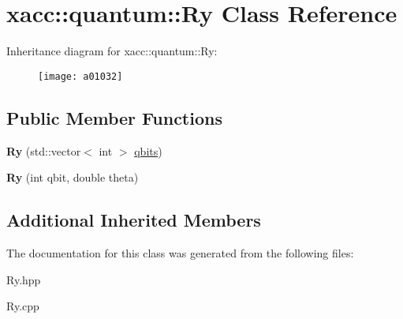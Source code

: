 \hypertarget{a01032}{}\section{xacc\+:\+:quantum\+:\+:Ry Class Reference}
\label{a01032}
Inheritance diagram for xacc\+:\+:quantum\+:\+:Ry\+:\begin{figure}[H]
\begin{center}
\leavevmode
\texttt{[image: a01032]}
\end{center}
\end{figure}
\subsection*{Public Member Functions}
\begin{DoxyCompactItemize}
\item 
\mbox{\label{a01032_a542e1c0576a8e784f6cece4c77598486}} 
{\bfseries Ry} (std\+::vector$<$ int $>$ \hyperlink{a00992_a2a56be6c2519ea65df4d06f4abae1393}{qbits})
\item 
\mbox{\label{a01032_a1cb81fe622168ba8d79fa2a78b5b0006}} 
{\bfseries Ry} (int qbit, double theta)
\end{DoxyCompactItemize}
\subsection*{Additional Inherited Members}


The documentation for this class was generated from the following files\+:\begin{DoxyCompactItemize}
\item 
Ry.\+hpp\item 
Ry.\+cpp\end{DoxyCompactItemize}
